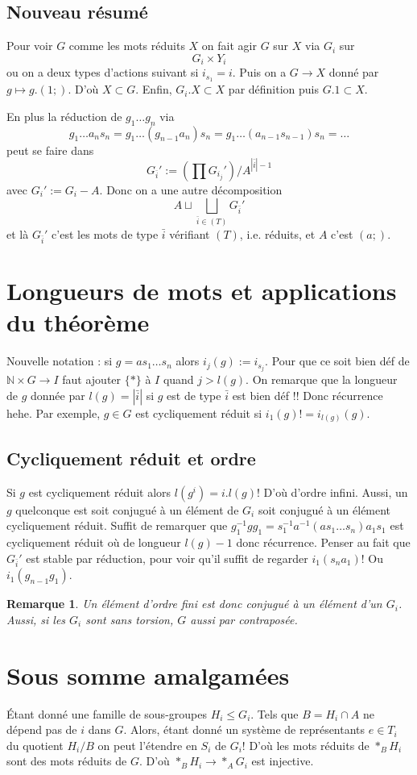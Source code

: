 \documentclass[a4paper,12pt]{book}
\newcommand{\N}{\mathbb{N}}
\theoremstyle{plain}
\newtheorem{rem}{Remarque}
\theoremstyle{definition}
\theoremstyle{remark}
\begin{document}
\subsection{Nouveau résumé}
Pour voir $G$ comme les mots réduits $X$ on fait agir $G$ sur
$X$ via $G_i$ sur 
\[G_i\times Y_i\]
ou on a deux types d'actions suivant si $i_{s_1}=i$.
Puis on a $G\to X$ donné par $g\mapsto g.(1;)$. D'où $X\subset G$.
Enfin, $G_i.X\subset X$ par définition puis $G.1\subset X$.

En plus la réduction de $g_1\ldots g_n$ via \[g_1\ldots a_n s_n=
g_1\ldots (g_{n-1}a_n)s_n=g_1\ldots(a_{n-1}s_{n-1})s_n=\ldots\]
peut se faire dans
\[G_{\bar i}':=(\prod G_{i_j}')/A^{|\bar i|-1}\]
avec $G_i':=G_i-A$. Donc on a une autre décomposition
\[A\sqcup \bigsqcup_{\bar i\in (T)}G_{\bar i}'\]
et là $G_{\bar i}'$ c'est les mots de type $\bar i$ vérifiant 
$(T)$, i.e. réduits, et $A$ c'est $(a;)$.

\section{Longueurs de mots et applications du théorème}
Nouvelle notation : si $g=as_1\ldots s_n$ alors $i_j(g):=i_{s_j}$.
Pour que ce soit bien déf de $\N\times G\to I$ faut ajouter 
$\{*\}$ à $I$ quand $j>l(g)$.
On remarque que la longueur de $g$ donnée par $l(g)=|\bar i|$ si
$g$ est de type $\bar i$ est bien déf !! Donc récurrence hehe.
Par exemple, $g\in G$ est cycliquement réduit si 
$i_1(g)!=i_{l(g)}(g)$. 
\subsection{Cycliquement réduit et ordre}
Si $g$ est cycliquement réduit alors $l(g^i)=i.l(g)$! D'où
d'ordre infini. Aussi, un $g$ quelconque est soit conjugué à un
élément de $G_i$ soit conjugué à un élément cycliquement réduit. 
Suffit de remarquer que 
$g_1^{-1}gg_1=s_1^{-1}a^{-1}(as_1\ldots s_n)a_1s_1$
est cycliquement réduit où de longueur $l(g)-1$ donc
récurrence. Penser au fait que $G_{\bar i}'$
est stable par réduction, pour voir qu'il suffit de regarder
$i_1(s_na_1)$! Ou $i_1(g_{n-1}g_1)$.

\begin{rem}
 Un élément d'ordre fini est donc conjugué à un élément d'un 
 $G_i$. Aussi, si les $G_i$ sont sans torsion, $G$ aussi par
 contraposée.
\end{rem}
\section{Sous somme amalgamées}
Étant donné une famille de sous-groupes $H_i\leq G_i$. Tels que
$B=H_i\cap A$ ne dépend pas de $i$ dans $G$. Alors, étant
donné un système de représentants $e\in T_i$ du quotient 
$H_i/B$ on peut l'étendre en $S_i$ de $G_i$! D'où les mots
réduits de $*_B H_i$ sont des mots réduits de $G$.
D'où $*_B H_i\to *_A G_i$ est injective.
\end{document}
